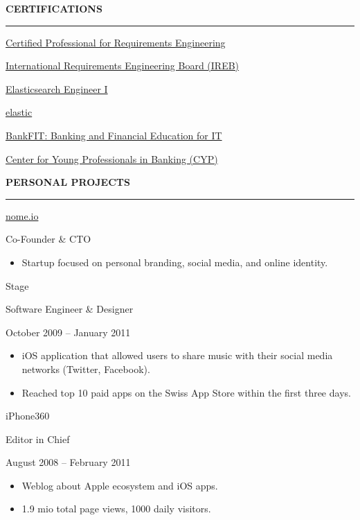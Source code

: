 \documentclass[11pt, a4paper, ragged2e, withhyper]{altacv}
\renewcommand{\cvsectionfont}{\Large\sffamily\bfseries}
\newcommand{\cveventbreak}[4]{%
  {\Large\color{emphasis}#1\par}
  \medskip\normalsize
  \ifstrequal{#2}{}{}{
  	{#2}}\par
  \ifstrequal{#3}{}{}{{
  	{#3}}}\par
  \ifstrequal{#4}{}{}{{
  	{#4}}}\par
  \medskip\normalsize
}
\renewcommand{\cvsection}[2][]{%
  \bigskip%
  \ifstrequal{#1}{}{}{\marginpar{\vspace*{\dimexpr1pt-\baselineskip}\raggedright}}%
  {\color{heading}\cvsectionfont\MakeUppercase{#2}}\\%
  {\color{headingrule}\rule{\linewidth}{0.5pt}\par}\bigskip
}
\begin{document}
\begin{paracol}{2}
	\newpage
	
	\cvsection{Certifications}
	\cveventbreak{\href{https://www.ireb.org/en/cpre/foundation/}{Certified Professional for Requirements Engineering}}{\href{https://www.ireb.org/en}{International Requirements Engineering Board (IREB)}}{}{}

	\bigskip
	\cveventbreak{\href{https://www.elastic.co/training/elasticsearch-engineer-1}{Elasticsearch Engineer I}}{\href{https://elastic.co}{elastic}}{}{}

	\bigskip
	\cveventbreak{\href{https://cyp.ch/smart-education/bankfit}{BankFIT: Banking and Financial Education for IT}}{\href{https://cyp.ch}{Center for Young Professionals in Banking (CYP)}}{}{}

	\cvsection{Personal Projects}
	
	\cveventbreak{\href{https://www.nome.io}{nome.io}}{Co-Founder \& CTO}{}{}
	\begin{itemize}[label=\color{bullet}\textbullet]
		\item Startup focused on personal branding, social media, and online identity.
	\end{itemize}
	
	\bigskip
	
	\cveventbreak{Stage}{Software Engineer \& Designer}{October 2009 -- January 2011}{}
	\begin{itemize}[label=\color{bullet}\textbullet]
		\item iOS application that allowed users to share music with their social media networks (Twitter, Facebook).
		\item Reached top 10 paid apps on the Swiss App Store within the first three days.
	\end{itemize}

	\bigskip
	
	\cveventbreak{iPhone360}{Editor in Chief}{August 2008 -- February 2011}{}
	\begin{itemize}[label=\color{bullet}\textbullet]
		\item Weblog about Apple ecosystem and iOS apps.
		\item 1.9 mio total page views, 1000 daily visitors.
	\end{itemize}


\end{paracol}
\end{document}
